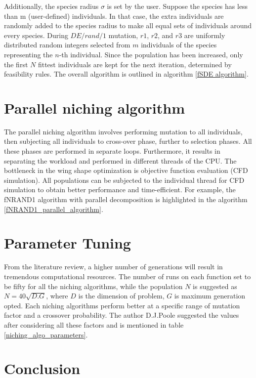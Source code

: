 Additionally, the species radius $\sigma$ is set by the user. Suppose the species has less than m (user-defined) individuals. In that case, the extra individuals are randomly added to the species radius to make all equal sets of individuals around every species. During $DE/rand/1$ mutation, $r1$, $r2$, and $r3$ are uniformly distributed random integers selected from $m$ individuals of the species representing the $n$-th individual. Since the population has been increased, only the first $N$ fittest individuals are kept for the next iteration, determined by feasibility rules. The overall algorithm is outlined in algorithm \ref{fSDE algorithm}.


\section{Parallel niching algorithm}
The parallel niching algorithm involves performing mutation to all individuals, then subjecting all individuals to cross-over phase, further to selection phases. All these phases are performed in separate loops. Furthermore, it results in separating the workload and performed in different threads of the CPU. The bottleneck in the wing shape optimization is objective function evaluation (CFD simulation). All populations can be subjected to the individual thread for CFD simulation to obtain better performance and time-efficient. For example, the fNRAND1 algorithm with parallel decomposition is highlighted in the algorithm \ref{fNRAND1_parallel_algorithm}.


\section{Parameter Tuning}
From the literature review, a higher number of generations will result in tremendous computational resources. The number of runs on each function set to be fifty for all the niching algorithms, while the population $N$ is suggested as $N=40 \sqrt{D. G}$, where $D$ is the dimension of problem, $G$ is maximum generation opted. Each niching algorithms perform better at a specific range of mutation factor and a crossover probability. The author D.J.Poole \cite{Poole3} suggested the values after considering all these factors and is mentioned in table \ref{niching_algo_parameters}.



\section{Conclusion}

